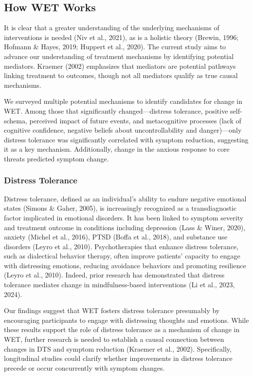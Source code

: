 \documentclass[
  man,floatsintext]{apa7}
\begin{document}
\subsection{How WET Works}\label{how-wet-works}

It is clear that a greater understanding of the underlying mechanisms of interventions is needed (Niv et al., 2021), as is a holistic theory (Brewin, 1996; Hofmann \& Hayes, 2019; Huppert et al., 2020).
The current study aims to advance our understanding of treatment mechanisms by identifying potential mediators.
Kraemer (2002) emphasizes that mediators are potential pathways linking treatment to outcomes, though not all mediators qualify as true causal mechanisms.

We surveyed multiple potential mechanisms to identify candidates for change in WET.
Among those that significantly changed---distress tolerance, positive self-schema, perceived impact of future events, and metacognitive processes (lack of cognitive confidence, negative beliefs about uncontrollability and danger)---only distress tolerance was significantly correlated with symptom reduction, suggesting it as a key mechanism.
Additionally, change in the anxious response to core threats predicted symptom change.

\subsubsection{Distress Tolerance}\label{distress-tolerance}

Distress tolerance, defined as an individual's ability to endure negative emotional states (Simons \& Gaher, 2005), is increasingly recognized as a transdiagnostic factor implicated in emotional disorders.
It has been linked to symptom severity and treatment outcome in conditions including depression (Lass \& Winer, 2020), anxiety (Michel et al., 2016), PTSD (Boffa et al., 2018), and substance use disorders (Leyro et al., 2010).
Psychotherapies that enhance distress tolerance, such as dialectical behavior therapy, often improve patients' capacity to engage with distressing emotions, reducing avoidance behaviors and promoting resilience (Leyro et al., 2010).
Indeed, prior research has demonstrated that distress tolerance mediates change in mindfulness-based interventions (Li et al., 2023, 2024).

Our findings suggest that WET fosters distress tolerance presumably by encouraging participants to engage with distressing thoughts and emotions.
While these results support the role of distress tolerance as a mechanism of change in WET, further research is needed to establish a causal connection between changes in DTS and symptom reduction (Kraemer et al., 2002).
Specifically, longitudinal studies could clarify whether improvements in distress tolerance precede or occur concurrently with symptom changes.
\end{document}
